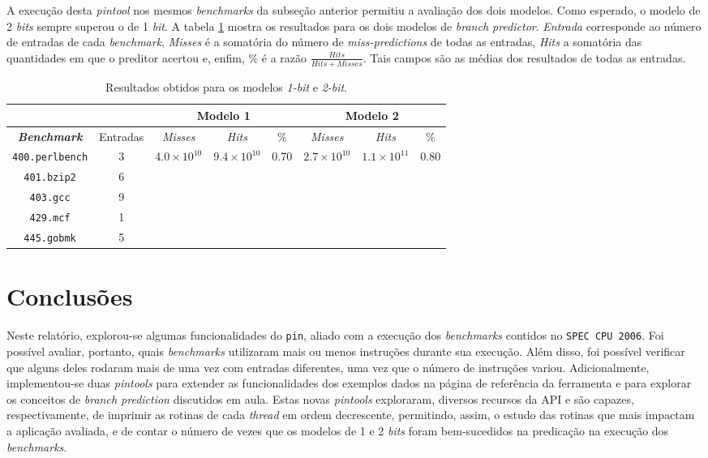 \documentclass[12pt]{article}
\begin{document}
A execução desta \textit{pintool} nos mesmos \textit{benchmarks} da subseção
anterior permitiu a avaliação dos dois modelos. Como esperado,
o modelo de 2 \textit{bits} sempre superou o de 1 \textit{bit}. A tabela
\ref{tab:modelos} mostra os resultados para os dois modelos de \textit{branch
predictor}. \textit{Entrada} corresponde ao número de entradas de cada
\textit{benchmark}, \textit{Misses} é a somatória do número de
\textit{miss-predictions} de todas as entradas, \textit{Hits} a somatória das
quantidades em que o preditor acertou e, enfim, \% é a razão 
\(\frac{Hits}{Hits+Misses}\). Tais campos são as médias dos resultados de todas
as entradas.

 \begin{table}[h]
    \centering
	\caption{\label{tab:modelos} Resultados obtidos para os modelos \textit{1-bit}
	e \textit{2-bit}.}
	\begin{tabular}{ c | c | c | c | c | c | c | c |}
		\hline
		\multicolumn{2}{c|}{} & \multicolumn{3}{c|}{\textbf{Modelo 1}} &
		\multicolumn{3}{c|}{\textbf{Modelo 2}}	\\ 	\hline 
		\textit{\textbf{Benchmark}} & Entradas  & \textit{Misses} & \textit{Hits} & \%
		& \textit{Misses} & \textit{Hits} & \% \\
		\hline \hline \texttt{400.perlbench} & 3 & \(4.0\times10^{10}\) &
		\(9.4\times10^{10}\) & 0.70 & \(2.7\times10^{10}\) & \(1.1\times10^{11}\)
		& 0.80
		\\
		\hline \texttt{401.bzip2} & 6 & &  & & & \\ \hline 
		\texttt{403.gcc} & 9 & & & & & \\
		\hline \texttt{429.mcf} & 1 & & & & & \\ \hline 
		\texttt{445.gobmk} & 5 & & & & & \\ \hline 		
	\end{tabular}	    
\end{table} 


\section{Conclusões}

Neste relatório, explorou-se algumas funcionalidades do \texttt{pin}, aliado
com a execução dos \textit{benchmarks} contidos no \texttt{SPEC CPU 2006}. Foi
possível avaliar, portanto, quais \textit{benchmarks} utilizaram mais
ou menos instruções durante sua execução. Além disso, foi possível verificar
que alguns deles rodaram mais de uma vez com entradas diferentes, uma vez que o número de
instruções variou. Adicionalmente, implementou-se duas \textit{pintools} para
extender as funcionalidades dos exemplos dados na página de referência da ferramenta e para
explorar os conceitos de \textit{branch prediction} discutidos em aula.
Estas novas \textit{pintools} exploraram, diversos recursos da API e são
capazes, respectivamente, de imprimir as rotinas de cada \textit{thread} em ordem
decrescente, permitindo, assim, o estudo das rotinas que mais impactam a aplicação
avaliada, e de contar o número de vezes que os modelos de 1 e 2 \textit{bits}
foram bem-sucedidos na predicação na execução dos \textit{benchmarks}.




\end{document}
